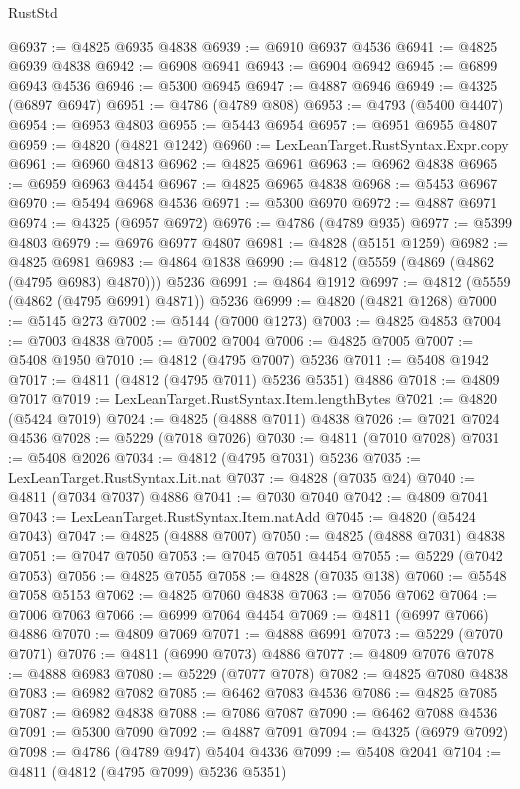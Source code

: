 \begin{lexlean}{RustStd}
\begin{coremodule}
{\begin{coremodule}
{{{{{{{{{{{{{{{{{{{{{{{{{{{{{{{{{{{{{{{{{{{{{{{{{{{{{{{{{{{{{{{{{{{{{{{{{{{{{{{{@6937 := @4825 @6935 @4838
@6939 := @6910 @6937 @4536
@6941 := @4825 @6939 @4838
@6942 := @6908 @6941
@6943 := @6904 @6942
@6945 := @6899 @6943 @4536
@6946 := @5300 @6945
@6947 := @4887 @6946
@6949 := @4325 (@6897 @6947)
@6951 := @4786 (@4789 @808)
@6953 := @4793 (@5400 @4407)
@6954 := @6953 @4803
@6955 := @5443 @6954
@6957 := @6951 @6955 @4807
@6959 := @4820 (@4821 @1242)
@6960 := LexLeanTarget.RustSyntax.Expr.copy
@6961 := @6960 @4813
@6962 := @4825 @6961
@6963 := @6962 @4838
@6965 := @6959 @6963 @4454
@6967 := @4825 @6965 @4838
@6968 := @5453 @6967
@6970 := @5494 @6968 @4536
@6971 := @5300 @6970
@6972 := @4887 @6971
@6974 := @4325 (@6957 @6972)
@6976 := @4786 (@4789 @935)
@6977 := @5399 @4803
@6979 := @6976 @6977 @4807
@6981 := @4828 (@5151 @1259)
@6982 := @4825 @6981
@6983 := @4864 @1838
@6990 := @4812 (@5559 (@4869 (@4862 (@4795 @6983) @4870))) @5236
@6991 := @4864 @1912
@6997 := @4812 (@5559 (@4862 (@4795 @6991) @4871)) @5236
@6999 := @4820 (@4821 @1268)
@7000 := @5145 @273
@7002 := @5144 (@7000 @1273)
@7003 := @4825 @4853
@7004 := @7003 @4838
@7005 := @7002 @7004
@7006 := @4825 @7005
@7007 := @5408 @1950
@7010 := @4812 (@4795 @7007) @5236
@7011 := @5408 @1942
@7017 := @4811 (@4812 (@4795 @7011) @5236 @5351) @4886
@7018 := @4809 @7017
@7019 := LexLeanTarget.RustSyntax.Item.lengthBytes
@7021 := @4820 (@5424 @7019)
@7024 := @4825 (@4888 @7011) @4838
@7026 := @7021 @7024 @4536
@7028 := @5229 (@7018 @7026)
@7030 := @4811 (@7010 @7028)
@7031 := @5408 @2026
@7034 := @4812 (@4795 @7031) @5236
@7035 := LexLeanTarget.RustSyntax.Lit.nat
@7037 := @4828 (@7035 @24)
@7040 := @4811 (@7034 @7037) @4886
@7041 := @7030 @7040
@7042 := @4809 @7041
@7043 := LexLeanTarget.RustSyntax.Item.natAdd
@7045 := @4820 (@5424 @7043)
@7047 := @4825 (@4888 @7007)
@7050 := @4825 (@4888 @7031) @4838
@7051 := @7047 @7050
@7053 := @7045 @7051 @4454
@7055 := @5229 (@7042 @7053)
@7056 := @4825 @7055
@7058 := @4828 (@7035 @138)
@7060 := @5548 @7058 @5153
@7062 := @4825 @7060 @4838
@7063 := @7056 @7062
@7064 := @7006 @7063
@7066 := @6999 @7064 @4454
@7069 := @4811 (@6997 @7066) @4886
@7070 := @4809 @7069
@7071 := @4888 @6991
@7073 := @5229 (@7070 @7071)
@7076 := @4811 (@6990 @7073) @4886
@7077 := @4809 @7076
@7078 := @4888 @6983
@7080 := @5229 (@7077 @7078)
@7082 := @4825 @7080 @4838
@7083 := @6982 @7082
@7085 := @6462 @7083 @4536
@7086 := @4825 @7085
@7087 := @6982 @4838
@7088 := @7086 @7087
@7090 := @6462 @7088 @4536
@7091 := @5300 @7090
@7092 := @4887 @7091
@7094 := @4325 (@6979 @7092)
@7098 := @4786 (@4789 @947) @5404 @4336
@7099 := @5408 @2041
@7104 := @4811 (@4812 (@4795 @7099) @5236 @5351)
}}}}}}}}}}}}}}}}}}}}}}}}}}}}}}}}}}}}}}}}}}}}}}}}}}}}}}}}}}}}}}}}}}}}}}}}}}}}}}}}
\end{coremodule}}
\end{coremodule}
\end{lexlean}

